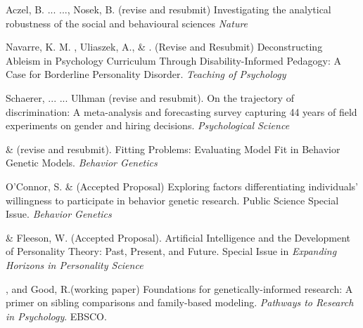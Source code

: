 \item Aczel, B. ... \meb..., Nosek, B. (revise and resubmit) Investigating the analytical robustness of the social and behavioural sciences \textit{Nature}

\item Navarre, K. M. \noteB, Uliaszek, A., \& \meb. (Revise and Resubmit) Deconstructing Ableism in Psychology Curriculum Through Disability-Informed Pedagogy: A Case for Borderline Personality Disorder. \textit{Teaching of Psychology}

\item Schaerer, ... \meb ... Ulhman (revise and resubmit). On the trajectory of discrimination: A meta-analysis and forecasting survey capturing 44 years of field experiments on gender and hiring decisions. \textit{Psychological Science}



\item \meb \& \joe (revise and resubmit). Fitting Problems: Evaluating Model Fit in Behavior Genetic Models. \textit{Behavior Genetics}  \href{https://doi.org/10.31234/osf.io/qys83}{\small\color{blue}{10.31234/osf.io/qys83}}


\item O'Connor, S. \& \meb (Accepted Proposal) Exploring factors differentiating individuals’ willingness to participate in behavior genetic research. Public Science Special Issue. \textit{Behavior Genetics}

\item \meb \& Fleeson, W. (Accepted Proposal). Artificial Intelligence and the Development of Personality Theory: Past, Present, and Future. Special Issue in \textit{Expanding Horizons in Personality Science}


\item \meb, and Good, R.\noteA (working paper) Foundations for genetically-informed research: A primer on sibling comparisons and family-based modeling. \textit{Pathways to Research in Psychology}. EBSCO.

%





